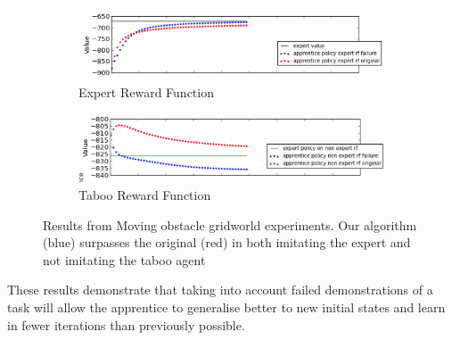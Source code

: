\documentclass[conference]{IEEEtran}
\begin{document}
\begin{figure}[t]
  \centering
  \begin{subfigure}[b]{0.5\textwidth}
    \includegraphics[scale=0.4]{resa}
    \caption{Expert Reward Function}
    \label{fig:res_a}
  \end{subfigure}
  \begin{subfigure}[b]{0.5\textwidth}
    \includegraphics[scale=0.4]{resb.png}
        \caption{Taboo Reward Function}
    \label{fig:res_b}
\end{subfigure}
  \caption{Results from Moving obstacle gridworld experiments. Our algorithm (blue) surpasses the original (red) in both imitating the expert and not imitating the taboo agent}
  \label{fig:res}
\vspace{-4mm}
\end{figure}


These results demonstrate that taking into account failed demonstrations of a task will allow the apprentice to generalise better to new initial states and learn in fewer iterations than previously possible.
\end{document}
